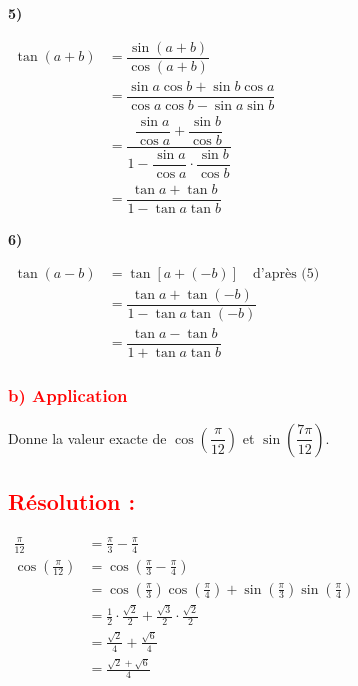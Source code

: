 \documentclass[a4paper,12pt]{article}
\begin{document}
\vspace{1em}
\textbf{5)} 

\(
\begin{aligned}
    \tan(a + b) &= \dfrac{\sin(a + b)}{\cos(a + b)}\\
    &= \dfrac{\sin a \cos b + \sin b \cos a}{\cos a \cos b - \sin a \sin b}\\
    &= \dfrac{\dfrac{\sin a}{\cos a} + \dfrac{\sin b}{\cos b}}{1 - \dfrac{\sin a}{\cos a} \cdot \dfrac{\sin b}{\cos b}}\\
    &= \dfrac{\tan a + \tan b}{1 - \tan a \tan b}
\end{aligned}
\)

\vspace{1em}
\textbf{6)} 

\(
\begin{aligned}
    \tan(a - b) &= \tan[a + (-b)] \quad \text{d'après (5)}\\
                &= \dfrac{\tan a + \tan(-b)}{1 - \tan a \tan(-b)}\\
                &= \dfrac{\tan a - \tan b}{1 + \tan a \tan b}
\end{aligned}
\)

\subsubsection*{\textcolor{red}{b) Application }}

Donne la valeur exacte de \( \cos\left(\dfrac{\pi}{12}\right) \) et \( \sin\left(\dfrac{7\pi}{12}\right) \).

\subsection*{\textcolor{red}{Résolution :}}

\(
\begin{aligned}
\frac{\pi}{12} &= \frac{\pi}{3} - \frac{\pi}{4} \\
\cos\left(\frac{\pi}{12}\right) &= \cos\left(\frac{\pi}{3} - \frac{\pi}{4}\right) \\
&= \cos\left(\frac{\pi}{3}\right)\cos\left(\frac{\pi}{4}\right) + \sin\left(\frac{\pi}{3}\right)\sin\left(\frac{\pi}{4}\right) \\
&= \frac{1}{2} \cdot \frac{\sqrt{2}}{2} + \frac{\sqrt{3}}{2} \cdot \frac{\sqrt{2}}{2} \\
&= \frac{\sqrt{2}}{4} + \frac{\sqrt{6}}{4} \\
&= \boxed{\frac{\sqrt{2} + \sqrt{6}}{4}}
\end{aligned}
\)
\end{document}
